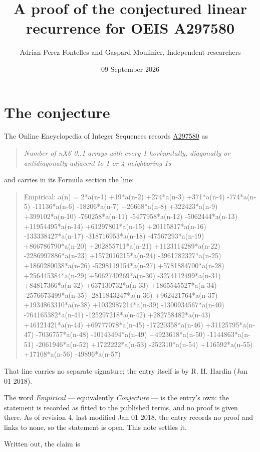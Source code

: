 \documentclass[11pt]{article}
\title{A proof of the conjectured linear recurrence for OEIS A297580}
\author{Adrian Perez Fontelles and Gaspard Moulinier, Independent researchers}
\date{09 September 2026}
\theoremstyle{definition}
\begin{document}
\maketitle
\section{The conjecture}

The Online Encyclopedia of Integer Sequences records \href{https://oeis.org/A297580}{A297580} as

\begin{quote}\itshape Number of nX6 0..1 arrays with every 1 horizontally, diagonally or antidiagonally adjacent to 1 or 4 neighboring 1s\end{quote}

and carries in its Formula section the line:

\begin{quote}\ttfamily Empirical: a(n) = 2*a(n-1) +19*a(n-2) +274*a(n-3) +371*a(n-4) -774*a(n-5) -11136*a(n-6) -18206*a(n-7) +26668*a(n-8) +322423*a(n-9) +399102*a(n-10) -760258*a(n-11) -5477958*a(n-12) -5062444*a(n-13) +11954495*a(n-14) +61297801*a(n-15) +20115817*a(n-16) -133338427*a(n-17) -318716953*a(n-18) -47567293*a(n-19) +866786790*a(n-20) +202855711*a(n-21) +1123114289*a(n-22) -2286997886*a(n-23) +1572016215*a(n-24) -3961782327*a(n-25) +1860280038*a(n-26) -5298119154*a(n-27) +5781884700*a(n-28) +256445384*a(n-29) +5062740269*a(n-30) -3274112499*a(n-31) +84817366*a(n-32) +637130732*a(n-33) +1865545527*a(n-34) -2576673499*a(n-35) -2811843247*a(n-36) +962421764*a(n-37) +1934863310*a(n-38) +1032987214*a(n-39) -1300934567*a(n-40) -764165382*a(n-41) -125297218*a(n-42) +282758482*a(n-43) +46121421*a(n-44) +69777078*a(n-45) -17220358*a(n-46) +31125795*a(n-47) -7036757*a(n-48) -10143494*a(n-49) +4923618*a(n-50) -1144863*a(n-51) -2061946*a(n-52) +1722222*a(n-53) -252310*a(n-54) +116592*a(n-55) +17108*a(n-56) -49896*a(n-57)\end{quote}

That line carries no separate signature; the entry itself is by R. H. Hardin (Jan 01 2018).

The word {\itshape Empirical} --- equivalently {\itshape Conjecture} --- is the entry's own: the statement is recorded as fitted to the published terms, and no proof is given there. As of revision 4, last modified Jan 01 2018, the entry records no proof and links to none, so the statement is open. This note settles it.

Written out, the claim is
\end{document}
